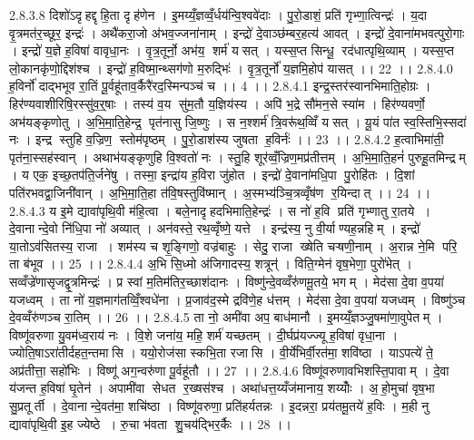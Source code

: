 2.8.3.8
दिशो॑ऽदृहद्दृहि॒ता दृह॑णेन । इ॒मय्यँ॒ज्ञव्वँ॒र्धय॑न्वि॒श्ववे॑दाः । पु॒रो॒डाशं॒ प्रति॑ गृभ्णा॒त्विन्द्रः॑ । य॒दा वृ॒त्रमत॑र॒च्छूर॒ इन्द्रः॑ । अथै॑करा॒जो अ॑भव॒ज्जना॑नाम् । इन्द्रो॑ दे॒वाञ्छ॑म्बर॒हत्य॑ आवत् । इन्द्रो॑ दे॒वाना॑मभवत्पुरो॒गाः । इन्द्रो॑ य॒ज्ञे ह॒विषा॑ वावृधा॒नः । वृ॒त्र॒तूर्नो॒ अभ॑य॒॒ शर्म॑ यसत् । यस्स॒प्त सिन्धू॒॒ रद॑धात्पृथि॒व्याम् । यस्स॒प्त लो॒कानकृ॑णो॒द्दिश॑श्च । इन्द्रो॑ ह॒विष्मा॒न्थ्सग॑णो म॒रुद्भिः॑ । वृ॒त्र॒तूर्नो॑ य॒ज्ञमि॒होप॑ यासत् ।। 22 ।।
2.8.4.0
ह॒विर्नो॑ दाद्भभूव रा॒तिं पू॒र्वहू॑ताव॒र्कैरै॑रद॒स्मिन्पञ्च॑ च ।। 4 ।।
2.8.4.1
इन्द्र॒स्तर॑स्वानभिमाति॒होग्रः । हिर॑ण्यवाशीरिषि॒रस्सु॑व॒र्॒षाः । तस्य॑ व॒य सु॑म॒तौ य॒ज्ञिय॑स्य । अपि॑ भ॒द्रे सौ॑मन॒से स्या॑म । हिर॑ण्यवर्णो॒ अभ॑यङ्कृणोतु । अ॒भि॒मा॒ति॒हेन्द्र॒ पृत॑नासु जि॒ष्णुः । स न॒श्शर्म॑ त्रि॒वरू॑थ॒व्विँ य॑सत् । यू॒यं पा॑त स्व॒स्तिभि॒स्सदा॑ नः । इन्द्र॑ स्तुहि व॒ज्रिण॒॒ स्तोम॑पृष्ठम् । पु॒रो॒डाश॑स्य जुषता ह॒विर्नः॑ ।। 23 ।।
2.8.4.2
ह॒त्वाभिमा॑ती॒ पृत॑ना॒स्सह॑स्वान् । अथाभ॑यङ्कृणुहि वि॒श्वतो॑ नः । स्तु॒हि शूर॑व्वँ॒ज्रिण॒मप्र॑तीत्तम् । अ॒भि॒मा॒ति॒हनं॑ पुरुहू॒तमिन्द्रम् । य एक॒ इच्छ॒तप॑ति॒र्जने॑षु । तस्मा॒ इन्द्रा॑य ह॒विरा जु॑होत । इन्द्रो॑ दे॒वाना॑मधि॒पा पु॒रोहि॑तः । दि॒शां पति॑रभवद्वा॒जिनी॑वान् । अ॒भि॒मा॒ति॒हा त॑वि॒षस्तुवि॑ष्मान् । अ॒स्मभ्य॑ञ्चि॒त्रव्वृँष॑ण र॒यिन्दात् ।। 24 ।।
2.8.4.3
य इ॒मे द्यावा॑पृथि॒वी म॑हि॒त्वा । बले॒नादृ॑हदभिमाति॒हेन्द्रः॑ । स नो॑ ह॒वि प्रति॑ गृभ्णातु रा॒तये । दे॒वानान्दे॒वो नि॑धि॒पा नो॑ अव्यात् । अन॑वस्ते॒ रथ॒व्वृँष्णे॒ यत्ते । इन्द्र॑स्य॒ नु वी॒र्याण्यह॒न्नहिम् । इन्द्रो॑ या॒तोऽव॑सितस्य॒ राजा । शम॑स्य च शृ॒ङ्गिणो॒ वज्र॑बाहुः । सेदु॒ राजा ख्षेति चऱ्षणी॒नाम् । अ॒रान्न ने॒मि परि॒ ता ब॑भूव ।। 25 ।।
2.8.4.4
अ॒भि सि॒ध्मो अ॑जिगादस्य॒ शत्रून्॑ । विति॒ग्मेन॑ वृष॒भेणा॒ पुरो॑भेत् । सव्वँज्रे॑णासृजद्वृ॒त्रमिन्द्रः॑ । प्र स्वां म॒तिम॑तिर॒च्छाश॑दानः । विष्णु॑न्दे॒वव्वँरु॑णमू॒तये॒ भगम् । मेद॑सा दे॒वा व॒पया॑ यजध्वम् । ता नो॑ य॒ज्ञमाग॑तव्विँ॒श्वधे॑ना । प्र॒जाव॑द॒स्मे द्रवि॑णे॒ह ध॑त्तम् । मेद॑सा दे॒वा व॒पया॑ यजध्वम् । विष्णु॑ञ्च दे॒वव्वँरु॑णञ्च रा॒तिम् ।। 26 ।।
2.8.4.5
ता नो॒ अमी॑वा अप॒ बाध॑मानौ । इ॒मय्यँ॒ज्ञञ्जु॒षमा॑णा॒वुपेतम् । विष्णू॑वरुणा यु॒वम॑ध्व॒राय॑ नः । वि॒शे जना॑य॒ महि॒ शर्म॑ यच्छतम् । दी॒र्घप्र॑यज्ज्यू ह॒विषा॑ वृधा॒ना । ज्योति॒षाऽरा॑तीर्दहत॒न्तमा॑सि । ययो॒रोज॑सा स्कभि॒ता रजा॑सि । वी॒र्ये॑भिर्वी॒रत॑मा॒ शवि॑ष्ठा । याऽपत्ये॑ ते॒ अप्र॑तीत्ता॒ सहो॑भिः । विष्णू॑ अग॒न्वरु॑णा पू॒र्वहू॑तौ ।। 27 ।।
2.8.4.6
विष्णू॑वरुणावभिशस्ति॒पावाम् । दे॒वा य॑जन्त ह॒विषा॑ घृ॒तेन॑ । अपामी॑वा सेधत र॒ख्षस॑श्च । अथा॑धत्त॒य्यँज॑मानाय॒ शय्योँः । अ॒॒हो॒मुचा॑ वृष॒भा सु॒प्रतूर्ती । दे॒वानान्दे॒वत॑मा॒ शचि॑ष्ठा । विष्णू॑वरुणा॒ प्रति॑हर्यतन्नः । इ॒दन्नरा॒ प्रय॑तमू॒तये॑ ह॒विः । म॒ही नु द्यावा॑पृथि॒वी इ॒ह ज्येष्ठे । रु॒चा भ॑वता शु॒चय॑द्भिर॒र्कैः ।। 28 ।।

